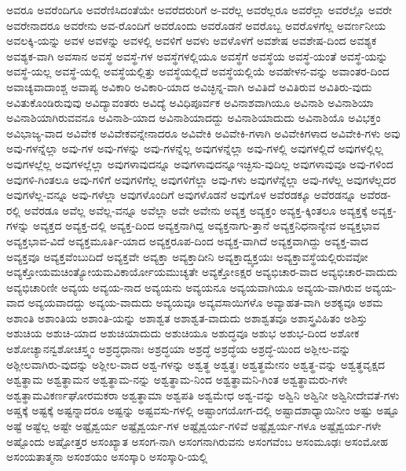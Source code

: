{ಅವರೂ
ಅವರೆಂದಿಗೂ
ಅವರೆಣಿಸಿದಂತೆಯೇ
ಅವರೆದರುರಿಗೆ
ಅ-ವರೆಲ್ಲ
ಅವರೆಲ್ಲರೂ
ಅವರೆಲ್ಲಾ
ಅವರೆಲ್ಲೊ
ಅವರೇ
ಅವರೇನಾದರೂ
ಅವರೇನು
ಅವ-ರೊಂದಿಗೆ
ಅವರೊಂದು
ಅವರೊಡನೆ
ಅವರೊಬ್ಬ
ಅವರೊಳಗೆಲ್ಲ
ಅವರ್ಣನೀಯ
ಅವಲಕ್ಕಿ-ಯನ್ನು
ಅವಳ
ಅವಳನ್ನು
ಅವಳಲ್ಲಿ
ಅವಳಿಗೆ
ಅವಳು
ಅವಳೊಳಗೆ
ಅವಶೇಷ
ಅವಶೇಷ-ದಿಂದ
ಅವಶ್ಯಕ
ಅವಶ್ಯಕ-ವಾಗಿ
ಅವಸಾನ
ಅವಸ್ಥೆ
ಅವಸ್ಥೆ-ಗಳ
ಅವಸ್ಥೆಗಳಲ್ಲಿಯೂ
ಅವಸ್ಥೆಗೆ
ಅವಸ್ಥೆಯ
ಅವಸ್ಥೆ-ಯಂತೆ
ಅವಸ್ಥೆ-ಯನ್ನು
ಅವಸ್ಥೆ-ಯಲ್ಲ
ಅವಸ್ಥೆ-ಯಲ್ಲಿ
ಅವಸ್ಥೆಯಲ್ಲಿತ್ತು
ಅವಸ್ಥೆಯಲ್ಲಿದೆ
ಅವಸ್ಥೆಯಲ್ಲಿಯೆ
ಅವಹೇಳನ-ವನ್ನು
ಅವಾಂತರ-ದಿಂದ
ಅವಾಚ್ಯವಾದಾಂಶ್ಚ
ಅವಾಪ್ಯ
ಅವಿಕಾರಿ
ಅವಿಕಾರಿ-ಯಾದ
ಅವಿಚ್ಛಿನ್ನ-ವಾಗಿ
ಅವಿತಿದೆ
ಅವಿತಿರುವ
ಅವಿತಿರು-ವುದು
ಅವಿತುಕೊಂಡಿರುವುವು
ಅವಿದ್ಯಾವಂತರು
ಅವಿದ್ಯೆ
ಅವಿಧಿಪೂರ್ವಕ
ಅವಿನಾಶವಾಗಿಯೂ
ಅವಿನಾಶಿ
ಅವಿನಾಶಿಯಾ
ಅವಿನಾಶಿಯಾಗಿರುವವನೂ
ಅವಿನಾಶಿ-ಯಾದ
ಅವಿನಾಶಿಯಾದದ್ದು
ಅವಿನಾಶಿಯಾದುದು
ಅವಿನಾಶಿಯೊ
ಅವಿಭಕ್ತಂ
ಅವಿಭಾಜ್ಯ-ವಾದ
ಅವಿವೇಕ
ಅವಿವೇಕವನ್ನೇನಾದರೂ
ಅವಿವೇಕಿ
ಅವಿವೇಕಿ-ಗಳಾಗಿ
ಅವಿವೇಕಿಗಳಾದ
ಅವಿವೇಕಿ-ಗಳು
ಅವು
ಅವು-ಗಳನ್ನೆಲ್ಲಾ
ಅವು-ಗಳ
ಅವು-ಗಳನ್ನು
ಅವು-ಗಳನ್ನೆಲ್ಲ
ಅವುಗಳನ್ನೆಲ್ಲಾ
ಅವು-ಗಳಲ್ಲಿ
ಅವುಗಳಲ್ಲಿದೆ
ಅವುಗಳಲ್ಲಿಲ್ಲ
ಅವುಗಳಲ್ಲೆಲ್ಲ
ಅವುಗಳಲ್ಲೆಲ್ಲಾ
ಅವುಗಳಾವುದನ್ನೂ
ಅವುಗಳಾವುದನ್ನೂಇಚ್ಛಿಸು-ವುದಿಲ್ಲ
ಅವುಗಳಾವುವೂ
ಅವು-ಗಳಿಂದ
ಅವುಗಳಿ-ಗಿಂತಲೂ
ಅವು-ಗಳಿಗೆ
ಅವುಗಳಿಗೆಲ್ಲ
ಅವುಗಳಿಗೆಲ್ಲಾ
ಅವು-ಗಳು
ಅವುಗಳೆನ್ನೆಲ್ಲಾ
ಅವು-ಗಳೆಲ್ಲ
ಅವುಗಳೆಲ್ಲದರ
ಅವುಗಳೆಲ್ಲ-ವನ್ನೂ
ಅವು-ಗಳೆಲ್ಲಾ
ಅವುಗಳೊಂದಿಗೆ
ಅವುಗಳೊಡನೆ
ಅವುಗೊಳ
ಅವೆರಡಕ್ಕೂ
ಅವೆರಡನ್ನೂ
ಅವೆರಡ-ರಲ್ಲಿ
ಅವೆರಡೂ
ಅವೆಲ್ಲ
ಅವೆಲ್ಲ-ವನ್ನೂ
ಅವೆಲ್ಲಾ
ಅವೇ
ಅವೇನು
ಅವ್ಯಕ್ತ
ಅವ್ಯಕ್ತಂ
ಅವ್ಯಕ್ತ-ಕ್ಕಿಂತಲೂ
ಅವ್ಯಕ್ತಕ್ಕೆ
ಅವ್ಯಕ್ತ-ಗಳನ್ನು
ಅವ್ಯಕ್ತದ
ಅವ್ಯಕ್ತ-ದಲ್ಲಿ
ಅವ್ಯಕ್ತ-ದಿಂದ
ಅವ್ಯಕ್ತನಾಗಿದ್ದ
ಅವ್ಯಕ್ತನಾಗು-ತ್ತಾನೆ
ಅವ್ಯಕ್ತನಿಧನಾನ್ಯೇವ
ಅವ್ಯಕ್ತಭಾವ
ಅವ್ಯಕ್ತಭಾವ-ವಿದೆ
ಅವ್ಯಕ್ತಮೂರ್ತಿ-ಯಾದ
ಅವ್ಯಕ್ತರೂಪ-ದಿಂದ
ಅವ್ಯಕ್ತ-ವಾಗಿದೆ
ಅವ್ಯಕ್ತವಾಗಿದ್ದು
ಅವ್ಯಕ್ತ-ವಾದ
ಅವ್ಯಕ್ತವೂ
ಅವ್ಯಕ್ತವೆಂಬುದಿದೆ
ಅವ್ಯಕ್ತವೇ
ಅವ್ಯಕ್ತಾ
ಅವ್ಯಕ್ತಾದೀನಿ
ಅವ್ಯಕ್ತಾದ್ವ್ಯಕ್ತಯಃ
ಅವ್ಯಕ್ತಾವಸ್ಥೆಯಲ್ಲಿರುವವೋ
ಅವ್ಯಕ್ತೋಯಮಚಿಂತ್ಯೋಯಮವಿಕಾರ್ಯೋಯಮುಚ್ಯತೇ
ಅವ್ಯಕ್ತೋಽಕ್ಷರ
ಅವ್ಯಭಿಚಾರ-ವಾದ
ಅವ್ಯಭಿಚಾರ-ವಾದುದು
ಅವ್ಯಭಿಚಾರಿಣೀ
ಅವ್ಯಯ
ಅವ್ಯಯ-ನಾದ
ಅವ್ಯಯನು
ಅವ್ಯಯನೂ
ಅವ್ಯಯವಾಗಿಯೂ
ಅವ್ಯಯ-ವಾಗಿರುವ
ಅವ್ಯಯ-ವಾದ
ಅವ್ಯಯವಾದದ್ದು
ಅವ್ಯಯ-ವಾದುದು
ಅವ್ಯಯವೂ
ಅವ್ಯವಸಾಯಿಗಳೊ
ಅವ್ಯಾಹತ-ವಾಗಿ
ಅಶಕ್ಯವೂ
ಅಶಮ
ಅಶಾಂತಿ
ಅಶಾಂತಿಯ
ಅಶಾಂತಿ-ಯನ್ನು
ಅಶಾಶ್ವತ
ಅಶಾಶ್ವತ-ವಾದುದು
ಅಶಾಶ್ವತವೂ
ಅಶಾಸ್ತ್ರವಿಹಿತಂ
ಅಶಿಸ್ತು
ಅಶುಚಿಯ
ಅಶುಚಿ-ಯಾದ
ಅಶುಚಿಯಾದುದು
ಅಶುಚಿಯೂ
ಅಶುದ್ಧವೂ
ಅಶುಭ
ಅಶುಭ-ದಿಂದ
ಅಶೋಕ
ಅಶೋಚ್ಯಾನನ್ವಶೋಚಸ್ತ್ವಂ
ಅಶ್ರದ್ಧಧಾನಾಃ
ಅಶ್ರದ್ಧಯಾ
ಅಶ್ರದ್ಧೆ
ಅಶ್ರದ್ಧೆಯ
ಅಶ್ರದ್ಧೆ-ಯಿಂದ
ಅಶ್ಲೀಲ-ವನ್ನು
ಅಶ್ಲೀಲವಾಗಿರು-ವುದನ್ನು
ಅಶ್ಲೀಲ-ವಾದ
ಅಶ್ವ-ಗಳನ್ನು
ಅಶ್ವತ್ಥ
ಅಶ್ವತ್ಥಃ
ಅಶ್ವತ್ಥಮೇನಂ
ಅಶ್ವತ್ಥ-ವನ್ನು
ಅಶ್ವತ್ಥವೃಕ್ಷದ
ಅಶ್ವತ್ಥಾಮ
ಅಶ್ವತ್ಥಾಮನ
ಅಶ್ವತ್ಥಾಮ-ನನ್ನು
ಅಶ್ವತ್ಥಾಮ-ನಿಂದ
ಅಶ್ವತ್ಥಾಮನಿ-ಗಿಂತ
ಅಶ್ವತ್ಥಾಮರು-ಗಳೇ
ಅಶ್ವತ್ಥಾಮವಿಕರ್ಣಘೋರಮಕರಾ
ಅಶ್ವತ್ಥಾಮಾ
ಅಶ್ವಪತಿ
ಅಶ್ವಮೇಧ
ಅಶ್ವ-ವನ್ನು
ಅಶ್ವಿನಿ
ಅಶ್ವಿನೀ
ಅಶ್ವಿನೀದೇವತೆ-ಗಳು
ಅಷ್ಚಕ್ಕೆ
ಅಷ್ಟಕ್ಕೆ
ಅಷ್ಟನ್ನಾದರೂ
ಅಷ್ಟನ್ನು
ಅಷ್ಟವಸು-ಗಳಲ್ಲಿ
ಅಷ್ಟಾಂಗಯೋಗ-ದಲ್ಲಿ
ಅಷ್ಟಾದಶಾಧ್ಯಾಯಿನೀಂ
ಅಷ್ಟು
ಅಷ್ಟೂ
ಅಷ್ಟೆ
ಅಷ್ಟೆಲ್ಲ
ಅಷ್ಟೇ
ಅಷ್ಟೈಶ್ವರ್ಯ
ಅಷ್ಟೈಶ್ವರ್ಯ-ಗಳ
ಅಷ್ಟೈಶ್ವರ್ಯ-ಗಳಿವೆ
ಅಷ್ಟೈಶ್ವರ್ಯ-ಗಳೂ
ಅಷ್ಟೈಶ್ವರ್ಯ-ಗಳೇ
ಅಷ್ಟೊಂದು
ಅಷ್ಟೋತ್ತರ
ಅಸಂಖ್ಯಾತ
ಅಸಂಗ-ನಾಗಿ
ಅಸಂಗನಾಗಿರುವನು
ಅಸಂಗವೆಂಬ
ಅಸಂಮೂಢಃ
ಅಸಂಮೋಹ
ಅಸಂಯತಾತ್ಮನಾ
ಅಸಂಶಯಂ
ಅಸಂಸ್ಕಾರಿ
ಅಸಂಸ್ಕಾರಿ-ಯಲ್ಲಿ
}
